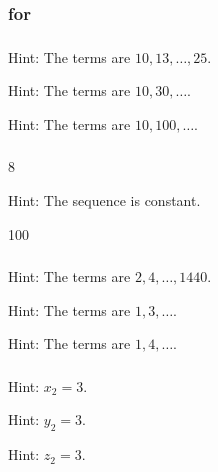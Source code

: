 \subsubsection{\answers for 
 \subrecdefseq}

\subsubsection*{ \answers}
\begin{apart}
    \item Hint: The terms are $10, 13, \ldots, 25$.
    \item Hint: The terms are $10, 30, \ldots$.
    \item Hint: The terms are $10, 100, \ldots$.
\end{apart}

\subsubsection*{ \answers}
\begin{apart}
    \item 8
    \item Hint: The sequence is constant.
    \item 100 
\end{apart}

\subsubsection*{ \answers}
\begin{apart}
    \item Hint: The terms are $2, 4, \ldots, 1440$.
    \item Hint: The terms are $1, 3, \ldots$.
    \item Hint: The terms are $1, 4, \ldots$.
\end{apart}

\subsubsection*{ \answers}
\begin{apart}
    \item Hint: $x_2=3$.
    \item Hint: $y_2=3$.
    \item Hint: $z_2=3$.
\end{apart}

